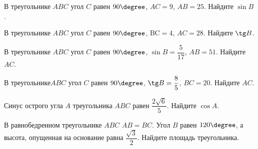 \begin{homework}[number=1]
	\begin{listofex}
		\item В треугольнике \( ABC \) угол \( C \) равен \( 90\degree \), \( AC=9 \), \( AB=25 \). Найдите \( \sin B \).
		\item В треугольнике \( ABC \) угол \( C \) равен \( 90\degree \), BC\( =4 \), \( AC=28 \). Найдите \( \tg B \).
		\item В треугольнике \( ABC \) угол \( C \) равен \( 90\degree \), \( \sin B=\dfrac{5}{17} \), \( AB=51 \). Найдите \( AC \).
		\item В треугольнике\( ABC \) угол \( C \) равен \( 90\degree \), \( \tg B=\dfrac{8}{5} \), \( BC=20 \). Найдите \( AC \).
		\item Синус острого угла \( A \) треугольника \( ABC \) равен \( \dfrac{2\sqrt{6}}{5} \). Найдите \( \cos A \).
		\item В равнобедренном треугольнике \( ABC \) \( AB=BC \). Угол \( B \) равен \( 120\degree \), а высота, опущенная на основание равна \( \dfrac{\sqrt{3}}{2} \). Найдите площадь треугольника.
	\end{listofex}
\end{homework}

